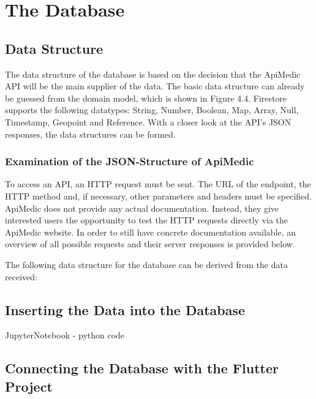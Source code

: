 
\chapter{The Database}



\section{Data Structure}
The data structure of the database is based on the decision that the ApiMedic API will be the main supplier of the data. The basic data structure can already be guessed from the domain model, which is shown in Figure 4.4. Firestore supports the following datatypes: String, Number, Boolean, Map, Array, Null, Timestamp, Geopoint and Reference. With a closer look at the API's JSON responses, the data structures can be formed.
\subsection{Examination of the JSON-Structure of ApiMedic}
To access an API, an HTTP request must be sent. The URL of the endpoint, the HTTP method and, if necessary, other parameters and headers must be specified. ApiMedic does not provide any actual documentation. Instead, they give interested users the opportunity to test the HTTP requests directly via the ApiMedic website. In order to still have concrete documentation available, an overview of all possible requests and their server responses is provided below.

The following data structure for the database can be derived from the data received:

\section{Inserting the Data into the Database}
JupyterNotebook - python code
\section{Connecting the Database with the Flutter Project}
